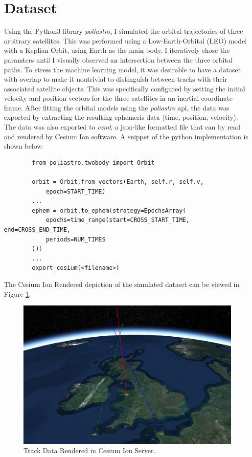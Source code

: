 \documentclass[./report_entry.tex]{subfiles}
\begin{document}
    \section*{Dataset}
    \noindent Using the Python3 library \textit{poliastro}, I simulated the orbital trajectories of three arbitrary satellites.
    This was performed using a Low-Earth-Orbital (LEO) model with a Keplian Orbit, using Earth as the main body.  I iteratively chose
    the paramters until I visually observed an intersection between the three orbital paths.  To stress the machine learning model,
    it was desirable to have a dataset with overlap to make it nontrivial to distinguish between tracks with their associated satellite objects.
    This was specifically configured by setting the initial velocity and position vectors for the three satellites in an inertial coordinate frame.
    After fitting the orbital models using the \textit{poliastro} api, the data was exported by extracting the resulting ephemeris data
    (time, position, velocity). The data was also exported to \textit{czml}, a json-like formatted file that can by read and rendered by Cesium Ion
    software.  A snippet of the python implementation is shown below:

    \begin{verbatim}
        from poliastro.twobody import Orbit

        orbit = Orbit.from_vectors(Earth, self.r, self.v, 
            epoch=START_TIME)
        ...
        ephem = orbit.to_ephem(strategy=EpochsArray(
            epochs=time_range(start=CROSS_START_TIME, end=CROSS_END_TIME, 
            periods=NUM_TIMES
        )))
        ...
        export_cesium(<filename>)
    \end{verbatim}

    The Cesium Ion Rendered depiction of the simulated dataset can be viewed in Figure \ref{cesium}.
    \clearpage

    \begin{figure}[!htbp]
        \centering
        \includegraphics[scale=0.43]{../graphics/cesium2.png}
        \caption{Track Data Rendered in Cesium Ion Server.}
        \label{cesium}
    \end{figure}
\end{document}
